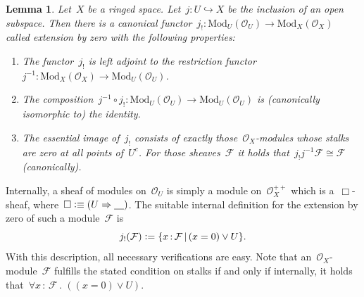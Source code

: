 \documentclass[10pt,reqno,a4paper]{amsbook}
\makeatletter
\theoremstyle{definition}
\theoremstyle{plain}
\newtheorem{lemma}[defn]{Lemma}
\theoremstyle{remark}
\newcommand{\F}{\mathcal{F}}
\renewcommand{\O}{\mathcal{O}}
\newcommand{\placeholder}{\underline{\quad}}
\newcommand{\Mod}{\mathrm{Mod}}
\newcommand{\?}{\,{:}\,}
\renewcommand{\_}{\mathpunct{.}\,}
\newcommand{\defeq}{\vcentcolon=}
\newcommand{\defequiv}{\vcentcolon\equiv}
\renewenvironment{proof}[1][\proofname]{\par
  \pushQED{\qed}%
  \normalfont \topsep6\p@\@plus6\p@\relax
  \trivlist
  \item[\hskip\labelsep
        \itshape
    #1\@addpunct{.}]\ignorespaces
}{%
  \popQED\endtrivlist\@endpefalse
}
\makeatother
\begin{document}
\begin{lemma}\label{lemma:extension-by-zero}
Let~$X$ be a ringed space. Let~$j : U \hookrightarrow X$ be the inclusion
of an open subspace. Then there is a canonical functor~$j_! : \Mod_U(\O_U) \to
\Mod_X(\O_X)$ called \emph{extension by zero} with the following properties:
\begin{enumerate}
\item The functor~$j_!$ is left adjoint to the restriction functor~$j^{-1} :
\Mod_X(\O_X) \to \Mod_U(\O_U)$.
\item The composition~$j^{-1} \circ j_! : \Mod_U(\O_U) \to \Mod_U(\O_U)$ is (canonically
isomorphic to) the identity.
\item The essential image of~$j_!$ consists of exactly those~$\O_X$-modules
whose stalks are zero at all points of~$U^c$. For those sheaves~$\F$ it holds
that~$j_!j^{-1}\F \cong \F$ (canonically).
\end{enumerate}
\end{lemma}
\begin{proof}Internally, a sheaf of modules on~$\O_U$ is simply a module
on~$\O_X^{++}$ which is a~$\Box$-sheaf, where~$\Box \defequiv (U \Rightarrow
\placeholder)$. The suitable internal definition for the extension by zero of
such a module~$\F$ is
\[ j_!(\F) \defeq \{ x\?\F \,|\, (x = 0) \vee U \}. \]
With this description, all necessary verifications are easy. Note that
an~$\O_X$-module~$\F$ fulfills the stated condition on stalks if and only if
internally, it holds that~$\forall x\?\F\_ ((x = 0) \vee U)$.
\end{proof}
\end{document}

